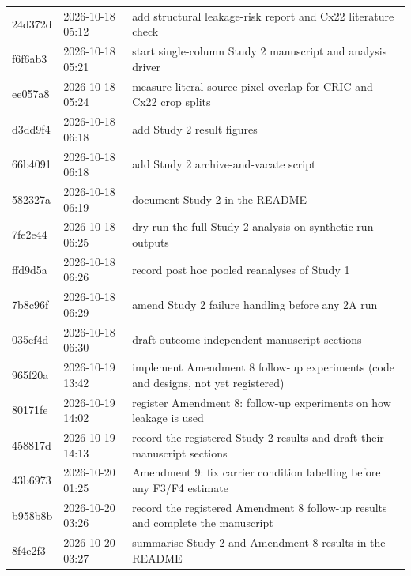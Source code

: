 {\begin{longtable}{llp{11.2cm}}
24d372d & 2026-10-18 05:12 & add structural leakage-risk report and Cx22 literature check \\
f6f6ab3 & 2026-10-18 05:21 & start single-column Study 2 manuscript and analysis driver \\
ee057a8 & 2026-10-18 05:24 & measure literal source-pixel overlap for CRIC and Cx22 crop splits \\
d3dd9f4 & 2026-10-18 06:18 & add Study 2 result figures \\
66b4091 & 2026-10-18 06:18 & add Study 2 archive-and-vacate script \\
582327a & 2026-10-18 06:19 & document Study 2 in the README \\
7fe2e44 & 2026-10-18 06:25 & dry-run the full Study 2 analysis on synthetic run outputs \\
ffd9d5a & 2026-10-18 06:26 & record post hoc pooled reanalyses of Study 1 \\
7b8c96f & 2026-10-18 06:29 & amend Study 2 failure handling before any 2A run \\
035ef4d & 2026-10-18 06:30 & draft outcome-independent manuscript sections \\
965f20a & 2026-10-19 13:42 & implement Amendment 8 follow-up experiments (code and designs, not yet registered) \\
80171fe & 2026-10-19 14:02 & register Amendment 8: follow-up experiments on how leakage is used \\
458817d & 2026-10-19 14:13 & record the registered Study 2 results and draft their manuscript sections \\
43b6973 & 2026-10-20 01:25 & Amendment 9: fix carrier condition labelling before any F3/F4 estimate \\
b958b8b & 2026-10-20 03:26 & record the registered Amendment 8 follow-up results and complete the manuscript \\
8f4e2f3 & 2026-10-20 03:27 & summarise Study 2 and Amendment 8 results in the README \\
\end{longtable}
}
